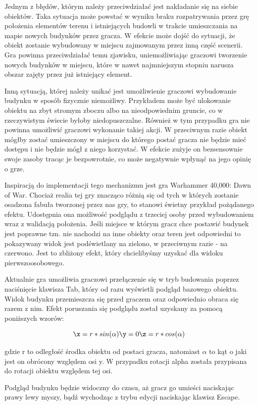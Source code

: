 Jednym z błędów, którym należy przeciwdziałać jest nakładanie się na siebie obiektów. Taka sytuacja może powstać w wyniku braku rozpatrywania przez grę położenia elementów terenu i istniejących budowli w trakcie umieszczania na mapie nowych budynków przez gracza. W efekcie może dojść do sytuacji, że obiekt zostanie wybudowany w miejscu zajmowanym przez inną część scenerii. Gra powinna przeciwdziałać temu zjawisku, uniemożliwiając graczowi tworzenie nowych budynków w miejscu, które w nawet najmniejszym stopniu narusza obszar zajęty przez już istniejący element.

Inną sytuacją, której należy unikać jest umożliwienie graczowi wybudowanie budynku w sposób fizycznie niemożliwy. Przykładem może być ulokowanie obiektu na zbyt stromym zboczu albo na nieodpowiednim gruncie, co w rzeczywistym świecie byłoby niedopuszczalne. Również w tym przypadku gra nie powinna umożliwić graczowi wykonanie takiej akcji. W przeciwnym razie obiekt mógłby zostać umieszczony w miejscu do którego postać gracza nie będzie mieć dostępu i nie będzie mógł z niego korzystać. W efekcie zużyje on bezsensownie swoje zasoby tracąc je bezpowrotnie, co może negatywnie wpłynąć na jego opinię o grze.

Inspiracją do implementacji tego mechanizmu jest gra Warhammer 40,000: Dawn of War. Chociaż realia tej gry znacząco różnią się od tych w których zostanie osadzona fabuła tworzonej przez nas gry, to stanowi świetny przykład pożądanego efektu. Udostępnia ona możliwość podglądu z trzeciej osoby przed wybudowaniem wraz z walidacją położenia. Jeśli miejsce w którym gracz chce postawić budynek jest poprawne tzn. nie nachodzi na inne obiekty oraz teren jest odpowiedni to pokazywany widok jest podświetlany na zielono, w przeciwnym razie - na czerwono. Jest to zbliżony efekt, który chcielibyśmy uzyskać dla widoku pierwszoosobowego.

Aktualnie gra umożliwia graczowi przełączenie się w tryb budowania poprzez naciśnięcie klawisza Tab, który od razu wyświetli podgląd bazowego obiektu. Widok budynku przemieszcza się przed graczem oraz odpowiednio obraca się razem z nim. Efekt poruszania się podglądu został uzyskany za pomocą poniższych wzorów:

\begin{equation*}
\x = r*sin(\alpha)
\y = 0
\z = r*cos(\alpha)
\end{equation*}

gdzie r to odległość środka obiektu od postaci gracza, natomiast \(\alpha\) to kąt o jaki jest on obrócony względem osi y. W przypadku rotacji alpha została przypisana do rotacji obiektu względem tej osi.

Podgląd budynku będzie widoczny do czasu, aż gracz go umieści naciskając prawy lewy myszy, bądź wychodząc z trybu edycji naciskając klawisz Escape.
